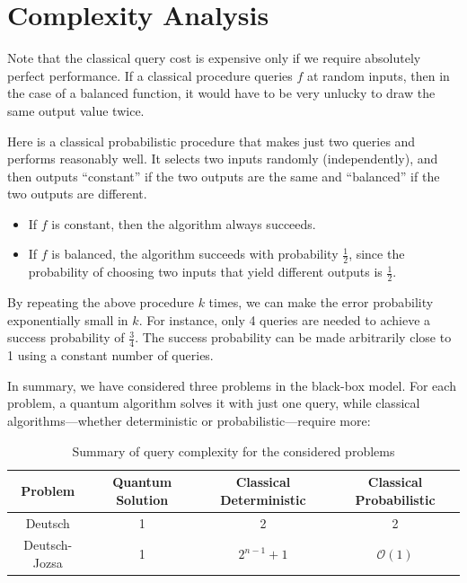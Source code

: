 \section{Complexity Analysis}

Note that the classical query cost is expensive only if we require absolutely perfect performance. If a classical procedure queries $f$ at random inputs, then in the case of a balanced function, it would have to be very unlucky to draw the same output value twice.

Here is a classical probabilistic procedure that makes just two queries and performs reasonably well. It selects two inputs randomly (independently), and then outputs ``constant'' if the two outputs are the same and ``balanced'' if the two outputs are different.

\begin{itemize}
    \item If $f$ is constant, then the algorithm always succeeds.
    \item If $f$ is balanced, the algorithm succeeds with probability $\frac{1}{2}$, since the probability of choosing two inputs that yield different outputs is $\frac{1}{2}$.
\end{itemize}

By repeating the above procedure $k$ times, we can make the error probability exponentially small in $k$. For instance, only 4 queries are needed to achieve a success probability of $\frac{3}{4}$. The success probability can be made arbitrarily close to 1 using a constant number of queries.

In summary, we have considered three problems in the black-box model. For each problem, a quantum algorithm solves it with just one query, while classical algorithms—whether deterministic or probabilistic—require more:

\begin{table}[ht]
    \centering
    \begin{tabular}{|c|c|c|c|}
        \hline
        \textbf{Problem} & \textbf{Quantum Solution} & \textbf{Classical Deterministic} & \textbf{Classical Probabilistic} \\
        \hline
        Deutsch & 1 & 2 & 2 \\
        \hline
        Deutsch-Jozsa & 1 & $2^{n-1} + 1$ & $\mathcal{O}(1)$ \\
        \hline
    \end{tabular}
    \caption{Summary of query complexity for the considered problems}
    \label{tab:deutsch_querycost}
\end{table}

